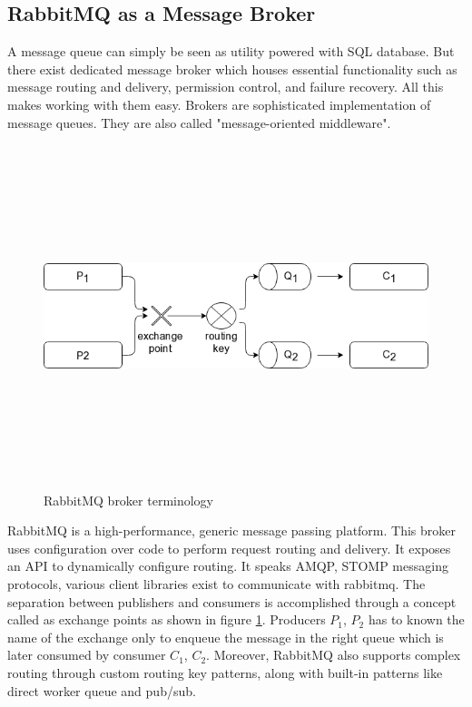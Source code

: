 \subsection{RabbitMQ as a Message Broker}
A message queue\cite{asyncmsg} can simply be seen as utility powered with SQL database. But there exist dedicated message
broker which houses essential functionality such as message routing and delivery, permission control, and
failure recovery. All this makes working with them easy. Brokers are sophisticated implementation of
message queues. They are also called "message-oriented middleware".
\begin{figure}[h!]
  \centering
  \includegraphics[width=14cm,height=10cm,keepaspectratio]{../media/crawler/rmq_exchange.png}
  \caption{RabbitMQ broker terminology}
  \label{fig:mqexchange}
\end{figure}

\noindent
RabbitMQ\cite{asyncmsg} is a high-performance, generic message passing platform. This broker uses configuration over code
to perform request routing and delivery. It exposes an API to dynamically configure routing. It speaks
AMQP, STOMP messaging protocols, various client libraries exist to communicate with rabbitmq. The
separation between publishers and consumers is accomplished through a concept called as exchange points as
shown in figure \ref{fig:mqexchange}. Producers $P_1$, $P_2$ has to known the name of the exchange only to
enqueue the message in the right queue which is later consumed by consumer $C_1$, $C_2$. Moreover, RabbitMQ
also supports complex routing through custom routing key patterns, along with built-in patterns like
direct worker queue and pub/sub.